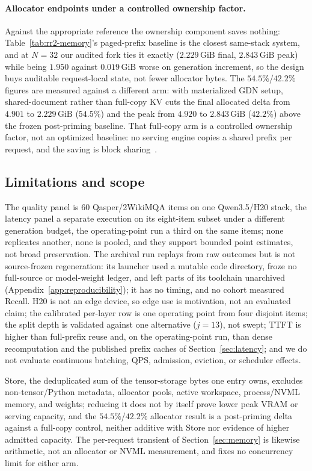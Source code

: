 \documentclass{article}
\newcommand{\gib}{\,\mathrm{GiB}}
\begin{document}
\paragraph{Allocator endpoints under a controlled ownership factor.}
Against the appropriate reference the ownership component saves nothing:
Table~\ref{tab:rr2-memory}'s paged-prefix baseline is the closest same-stack
system, and at $N=32$ our audited fork ties it exactly ($2.229\gib$ final,
$2.843\gib$ peak) while being $1.950$ against $0.019\gib$ worse on generation
increment, so the design buys auditable request-local state, not fewer allocator
bytes.  The $54.5\%$/$42.2\%$ figures are measured against a different arm: with
materialized GDN setup, shared-document rather than full-copy KV cuts the final allocated
delta from $4.901$ to $2.229\gib$ ($54.5\%$) and the peak from $4.920$ to
$2.843\gib$ ($42.2\%$) above the frozen post-priming baseline.  That full-copy
arm is a controlled ownership factor, not an optimized baseline: no serving
engine copies a shared prefix per request, and the saving is block
sharing~\citep{kwon2023pagedattention}.

\subsection{Limitations and scope}
\label{sec:limitations}

The quality panel is 60 Qasper/2WikiMQA items on one Qwen3.5/H20 stack, the
latency panel a separate execution on its eight-item subset under a different
generation budget, the operating-point run a third on the same items; none
replicates another, none is pooled, and they support bounded point estimates,
not broad preservation.  The archival run replays from raw outcomes but is not
source-frozen regeneration: its launcher used a mutable code directory, froze no
full-source or model-weight ledger, and left parts of its toolchain unarchived
(Appendix~\ref{app:reproducibility}); it has no timing, and no cohort measured
Recall.  H20 is not an edge device, so edge use is motivation, not an evaluated
claim; the calibrated per-layer row is one operating point from four disjoint
items; the split depth is validated against one alternative ($j=13$), not swept;
TTFT is higher than full-prefix reuse and, on the operating-point run, than
dense recomputation and the published prefix caches of
Section~\ref{sec:latency}; and we do not evaluate continuous batching, QPS,
admission, eviction, or scheduler effects.

Store, the deduplicated sum of the tensor-storage bytes one entry owns, excludes
non-tensor/Python metadata, allocator pools, active workspace, process/NVML
memory, and weights; reducing it does not by itself prove lower peak VRAM or
serving capacity, and the $54.5\%$/$42.2\%$ allocator result is a post-priming
delta against a full-copy control, neither additive with Store nor evidence of
higher admitted capacity.  The per-request transient of Section~\ref{sec:memory}
is likewise arithmetic, not an allocator or NVML measurement, and fixes no
concurrency limit for either arm.
\end{document}
